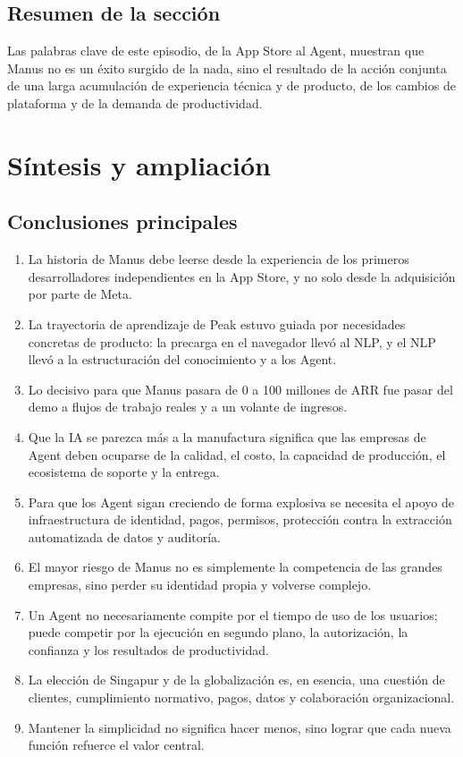 \documentclass[a4paper]{article}
\begin{document}
\subsection{Resumen de la sección}

Las palabras clave de este episodio, de la App Store al Agent, muestran que Manus no es un éxito surgido de la nada, sino el resultado de la acción conjunta de una larga acumulación de experiencia técnica y de producto, de los cambios de plataforma y de la demanda de productividad.
\section{Síntesis y ampliación}

\subsection{Conclusiones principales}

\begin{enumerate}
\item La historia de Manus debe leerse desde la experiencia de los primeros desarrolladores independientes en la App Store, y no solo desde la adquisición por parte de Meta.
\item La trayectoria de aprendizaje de Peak estuvo guiada por necesidades concretas de producto: la precarga en el navegador llevó al NLP, y el NLP llevó a la estructuración del conocimiento y a los Agent.
\item Lo decisivo para que Manus pasara de 0 a 100 millones de ARR fue pasar del demo a flujos de trabajo reales y a un volante de ingresos.
\item Que la IA se parezca más a la manufactura significa que las empresas de Agent deben ocuparse de la calidad, el costo, la capacidad de producción, el ecosistema de soporte y la entrega.
\item Para que los Agent sigan creciendo de forma explosiva se necesita el apoyo de infraestructura de identidad, pagos, permisos, protección contra la extracción automatizada de datos y auditoría.
\item El mayor riesgo de Manus no es simplemente la competencia de las grandes empresas, sino perder su identidad propia y volverse complejo.
\item Un Agent no necesariamente compite por el tiempo de uso de los usuarios; puede competir por la ejecución en segundo plano, la autorización, la confianza y los resultados de productividad.
\item La elección de Singapur y de la globalización es, en esencia, una cuestión de clientes, cumplimiento normativo, pagos, datos y colaboración organizacional.
\item Mantener la simplicidad no significa hacer menos, sino lograr que cada nueva función refuerce el valor central.
\end{enumerate}
\end{document}
